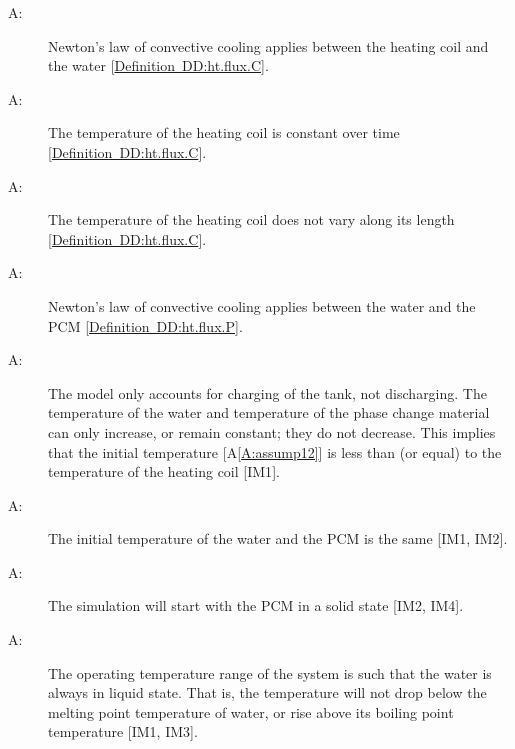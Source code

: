 \documentclass[12pt]{article}
\newcounter{assumpnum}
\newcommand{\atheassumpnum}{A\theassumpnum}
\begin{document}
\begin{description}
\item[\atheassumpnum\label{A:assump7}:]Newton's law of convective cooling applies between the heating coil and the water {[}\hyperref[DD:ht.flux.C]{Definition~DD:ht.flux.C}{]}.
\end{description}
\begin{description}
\item[\atheassumpnum\label{A:assump8}:]The temperature of the heating coil is constant over time {[}\hyperref[DD:ht.flux.C]{Definition~DD:ht.flux.C}{]}.
\end{description}
\begin{description}
\item[\atheassumpnum\label{A:assump9}:]The temperature of the heating coil does not vary along its length {[}\hyperref[DD:ht.flux.C]{Definition~DD:ht.flux.C}{]}.
\end{description}
\begin{description}
\item[\atheassumpnum\label{A:assump10}:]Newton's law of convective cooling applies between the water and the PCM {[}\hyperref[DD:ht.flux.P]{Definition~DD:ht.flux.P}{]}.
\end{description}
\begin{description}
\item[\atheassumpnum\label{A:assump11}:]The model only accounts for charging of the tank, not discharging. The temperature of the water and temperature of the phase change material can only increase, or remain constant; they do not decrease. This implies that the initial temperature {[}A\ref{A:assump12}{]} is less than (or equal) to the temperature of the heating coil {[}IM1{]}.
\end{description}
\begin{description}
\item[\atheassumpnum\label{A:assump12}:]The initial temperature of the water and the PCM is the same {[}IM1, IM2{]}.
\end{description}
\begin{description}
\item[\atheassumpnum\label{A:assump13}:]The simulation will start with the PCM in a solid state {[}IM2, IM4{]}.
\end{description}
\begin{description}
\item[\atheassumpnum\label{A:assump14}:]The operating temperature range of the system is such that the water is always in liquid state. That is, the temperature will not drop below the melting point temperature of water, or rise above its boiling point temperature {[}IM1, IM3{]}.
\end{description}
\end{document}
